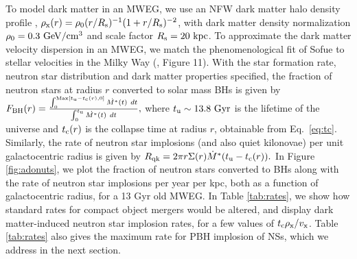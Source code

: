 \documentclass[nofootinbib,longbibliography,prd,floatfix,superscriptaddress,twocolumn]{revtex4-1}
\begin{document}
To model dark matter in an MWEG, we use an NFW dark matter halo density profile \cite{Navarro:1996gj}, \mbox{$\rho_{\rm x}(r) = \rho_0 (r/R_{\rm s})^{-1}(1+r/R_{\rm s})^{-2}$}, with dark matter density normalization $\rho_0 = 0.3 ~{\rm GeV/cm^3}$ and scale factor $R_{\rm s}=20~{\rm kpc}$. To approximate the dark matter velocity dispersion in an MWEG, we match the phenomenological fit of Sofue to stellar velocities in the Milky Way (\cite{Sofue:2013kja}, Figure 11).  With the star formation rate, neutron star distribution and dark matter properties specified, the fraction of neutron stars at radius $r$ converted to solar mass BHs is given by
$
F_{\rm BH}(r) = \frac{ \int_0^{{\rm Max}[t_{\rm u} - t_{\rm c} (r),0]} \dot{M^*}(t)~dt}{ \int_0^{t_{\rm u}} \dot{M^*}(t)~dt},
$
where $t_{\rm u} \sim 13.8 ~{\rm Gyr}$ is the lifetime of the universe and $t_{\rm c}(r)$ is the collapse time at radius $r$, obtainable from Eq.~\eqref{eq:tc}. Similarly, the rate of neutron star implosions (and also quiet kilonovae) per unit galactocentric radius is given by
$
R_{\rm qk} = 2 \pi r \Sigma(r) \dot{M}^*(t_{\rm u} -  t_{\rm c} (r)).
$
In Figure \ref{fig:adonuts}, we plot the fraction of neutron stars converted to BHs along with the rate of neutron star implosions per year per kpc, both as a function of galactocentric radius, for a 13 Gyr old MWEG. In Table \ref{tab:rates}, we show how standard rates for compact object mergers would be altered, and display dark matter-induced neutron star implosion rates, for a few values of $t_{\rm c} \rho_{\rm x} /v_{\rm x} $. Table \ref{tab:rates} also gives the maximum rate for PBH implosion of NSs, which we address in the next section.
\end{document}
